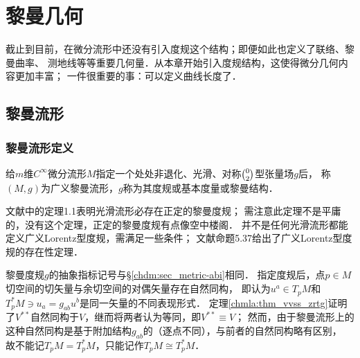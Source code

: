 
\chapter{黎曼几何}\label{chrg}



截止到目前，在微分流形中还没有引入度规这个结构；即便如此也定义了联络、黎曼曲率、
测地线等等重要几何量．从本章开始引入度规结构，这使得微分几何内容更加丰富；
一件很重要的事：可以定义曲线长度了．


\section{黎曼流形}\label{chrg:sec_riemann}
\subsection{黎曼流形定义}
\begin{definition}
    给$m$维$C^\infty$微分流形$M$指定一个处处非退化、光滑、对称$\binom{0}{2}$型张量场$g$后，
    称$(M,g)$为广义{\heiti 黎曼流形}，$g$称为其{\heiti 度规}或{\heiti 基本度量}或{\heiti 黎曼结构}．
\end{definition}


\begin{remark}
    文献\parencite[\S 5.1]{cc2001-zh}中的定理1.1表明光滑流形必存在正定的黎曼度规；
    需注意此定理不是平庸的，没有这个定理，正定的黎曼度规有点像空中楼阁．
    并不是任何光滑流形都能定义广义Lorentz型度规，需满足一些条件；
    文献\parencite{oneill1983}命题5.37给出了广义Lorentz型度规的存在性定理．
\end{remark}

\begin{remark}
    黎曼度规$g$的抽象指标记号与\S\ref{chdm:sec_metric-abi}相同．
    指定度规后，点$p\in M$切空间的切矢量与余切空间的对偶矢量存在自然同构，
    即认为$u^a\in T_pM$和$T^*_pM \ni u_a = g_{ab}u^b$是同一矢量的不同表现形式．
    定理\ref{chmla:thm_vvss_zrtg}证明了$V^{**}$自然同构于$V$，继而将两者认为等同，即$V^{**}\equiv V$；
    然而，由于黎曼流形上的这种自然同构是基于附加结构$g_{ab}$的（逐点不同），与前者的自然同构略有区别，
    故不能记$T_pM=T^*_pM$，只能记作$T_pM\cong T^*_pM$．
\end{remark}

